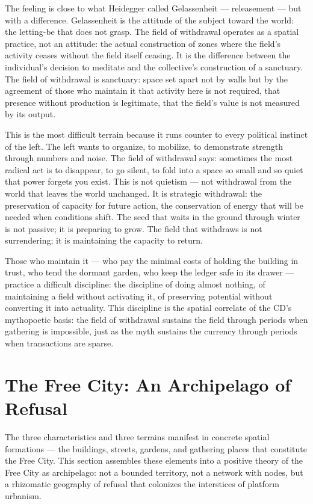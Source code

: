 The feeling is close to what Heidegger called Gelassenheit — releasement — but with a difference. Gelassenheit is the attitude of the subject toward the world: the letting-be that does not grasp. The field of withdrawal operates as a spatial practice, not an attitude: the actual construction of zones where the field's activity ceases without the field itself ceasing. It is the difference between the individual's decision to meditate and the collective's construction of a sanctuary. The field of withdrawal is sanctuary: space set apart not by walls but by the agreement of those who maintain it that activity here is not required, that presence without production is legitimate, that the field's value is not measured by its output.

This is the most difficult terrain because it runs counter to every political instinct of the left. The left wants to organize, to mobilize, to demonstrate strength through numbers and noise. The field of withdrawal says: sometimes the most radical act is to disappear, to go silent, to fold into a space so small and so quiet that power forgets you exist. This is not quietism — not withdrawal from the world that leaves the world unchanged. It is strategic withdrawal: the preservation of capacity for future action, the conservation of energy that will be needed when conditions shift. The seed that waits in the ground through winter is not passive; it is preparing to grow. The field that withdraws is not surrendering; it is maintaining the capacity to return.

Those who maintain it — who pay the minimal costs of holding the building in trust, who tend the dormant garden, who keep the ledger safe in its drawer — practice a difficult discipline: the discipline of doing almost nothing, of maintaining a field without activating it, of preserving potential without converting it into actuality. This discipline is the spatial correlate of the CD's mythopoetic basis: the field of withdrawal sustains the field through periods when gathering is impossible, just as the myth sustains the currency through periods when transactions are sparse.

\section{The Free City: An Archipelago of Refusal}

The three characteristics and three terrains manifest in concrete spatial formations — the buildings, streets, gardens, and gathering places that constitute the Free City. This section assembles these elements into a positive theory of the Free City as archipelago: not a bounded territory, not a network with nodes, but a rhizomatic geography of refusal that colonizes the interstices of platform urbanism.

